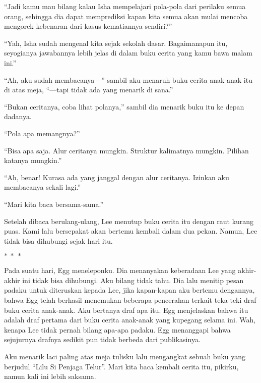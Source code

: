 \documentclass[smalldemyvopaper,11pt,twoside,onecolumn,openright,extrafontsizes]{memoir}
\newcommand\separator{
  \begin{center}
    \(\ast~\ast~\ast\)
  \end{center}
}
\begin{document}

``Jadi kamu mau bilang kalau Isha mempelajari pola-pola dari perilaku semua orang, sehingga dia dapat memprediksi kapan kita semua akan mulai mencoba mengorek kebenaran dari kasus kematiannya sendiri?''

``Yah, Isha sudah mengenal kita sejak sekolah dasar. Bagaimanapun itu, seyogianya jawabannya lebih jelas di dalam buku cerita yang kamu bawa malam ini.''

``Ah, aku sudah membacanya---'' sambil aku menaruh buku cerita anak-anak itu di atas meja, ``---tapi tidak ada yang menarik di sana.''


``Bukan ceritanya, coba lihat polanya,'' sambil dia menarik buku itu ke depan dadanya.

``Pola apa memangnya?''

``Bisa apa saja. Alur ceritanya mungkin. Struktur kalimatnya mungkin. Pilihan katanya mungkin.''

``Ah, benar! Kurasa ada yang janggal dengan alur ceritanya. Izinkan aku membacanya sekali lagi.''

``Mari kita baca bersama-sama.''


Setelah dibaca berulang-ulang, Lee menutup buku cerita itu dengan raut kurang puas. Kami lalu bersepakat akan bertemu kembali dalam dua pekan. Namun, Lee tidak bisa dihubungi sejak hari itu.

\separator{}

Pada suatu hari, Egg meneleponku. Dia menanyakan keberadaan Lee yang akhir-akhir ini tidak bisa dihubungi. Aku bilang tidak tahu. Dia lalu menitip pesan padaku untuk diteruskan kepada Lee, jika kapan-kapan aku bertemu dengannya, bahwa Egg telah berhasil menemukan beberapa pencerahan terkait teka-teki draf buku cerita anak-anak. Aku bertanya draf apa itu. Egg menjelaskan bahwa itu adalah draf pertama dari buku cerita anak-anak yang kupegang selama ini. Wah, kenapa Lee tidak pernah bilang apa-apa padaku. Egg menanggapi bahwa sejujurnya drafnya sedikit pun tidak berbeda dari publikasinya.


Aku menarik laci paling atas meja tulisku lalu mengangkat sebuah buku yang berjudul ``Lilu Si Penjaga Telur''. Mari kita baca kembali cerita itu, pikirku, namun kali ini lebih saksama.
\end{document}
